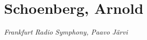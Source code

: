 \chapter{Schoenberg, Arnold}
\label{cha:schoenberg}


  \textit{Frankfurt Radio Symphony, Paavo J\"{a}rvi} 